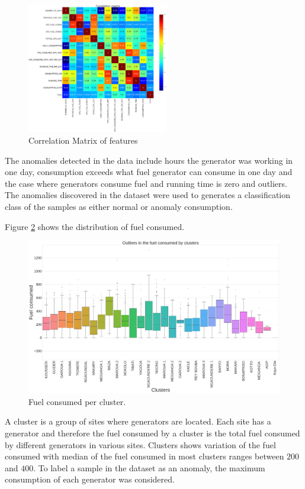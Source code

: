 \documentclass[final,5p,times,twocolumn,authoryear]{elsarticle}
\begin{document}
\begin{figure}[H]
      \centering
      \includegraphics[width=0.55\textwidth]{Figures/correlation_matrix} %
   
     \caption{Correlation Matrix of features}
    \label{fig:correlation matrix}
   \end{figure}

The anomalies detected in the data include hours the generator was working in one day, consumption exceeds what fuel generator can consume in one day and the case where generators consume fuel and running time is zero and outliers. The anomalies discovered in the dataset were used to generates a classification class of the samples as either normal or anomaly consumption. 

Figure 	\ref{fig:boxplot} shows the distribution of fuel consumed.
\begin{figure}[H]
	\centering
	\includegraphics[width=1.1\linewidth]{Figures/Boxplot.png}
	\caption{Fuel consumed per cluster.}
	\label{fig:boxplot}
\end{figure}
A cluster is a group of sites where generators are located. Each site has a generator and therefore the fuel consumed by a cluster is the total fuel consumed by different generators in various sites. Clusters shows variation of the fuel consumed with median of the fuel consumed in most clusters ranges between $200$ and $400$. To label  a sample in the dataset as an anomaly,  the maximum consumption of each generator was considered. 
\end{document}
